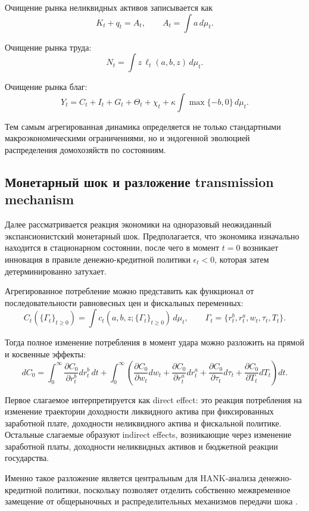 \documentclass[12pt,a4paper]{article}
\begin{document}
Очищение рынка неликвидных активов записывается как
\[
K_t + q_t = A_t,
\qquad
A_t = \int a\, d\mu_t.
\]

Очищение рынка труда:
\[
N_t = \int z\, \ell_t(a,b,z)\, d\mu_t.
\]

Очищение рынка благ:
\[
Y_t = C_t + I_t + G_t + \Theta_t + \chi_t + \kappa \int \max\{-b,0\}\, d\mu_t.
\]

Тем самым агрегированная динамика определяется не только стандартными макроэкономическими ограничениями, но и эндогенной эволюцией распределения домохозяйств по состояниям.

\subsection{Монетарный шок и разложение transmission mechanism}

Далее рассматривается реакция экономики на одноразовый неожиданный экспансионистский монетарный шок. Предполагается, что экономика изначально находится в стационарном состоянии, после чего в момент $t=0$ возникает инновация в правиле денежно-кредитной политики $\epsilon_t<0$, которая затем детерминированно затухает.

Агрегированное потребление можно представить как функционал от последовательности равновесных цен и фискальных переменных:
\[
C_t(\{\Gamma_t\}_{t\ge 0}) = \int c_t(a,b,z;\{\Gamma_t\}_{t\ge 0})\, d\mu_t,
\qquad
\Gamma_t=\{r_t^b,r_t^a,w_t,\tau_t,T_t\}.
\]

Тогда полное изменение потребления в момент удара можно разложить на прямой и косвенные эффекты:
\[
dC_0
=
\int_0^\infty \frac{\partial C_0}{\partial r_t^b}dr_t^b\,dt
+
\int_0^\infty
\left(
\frac{\partial C_0}{\partial w_t}dw_t
+
\frac{\partial C_0}{\partial r_t^a}dr_t^a
+
\frac{\partial C_0}{\partial \tau_t}d\tau_t
+
\frac{\partial C_0}{\partial T_t}dT_t
\right)dt.
\]

Первое слагаемое интерпретируется как direct effect: это реакция потребления на изменение траектории доходности ликвидного актива при фиксированных заработной плате, доходности неликвидного актива и фискальной политике. Остальные слагаемые образуют indirect effects, возникающие через изменение заработной платы, доходности неликвидных активов и бюджетной реакции государства.

Именно такое разложение является центральным для HANK-анализа денежно-кредитной политики, поскольку позволяет отделить собственно межвременное замещение от общерыночных и распределительных механизмов передачи шока \cite{KaplanMollViolante2018}.
\end{document}
